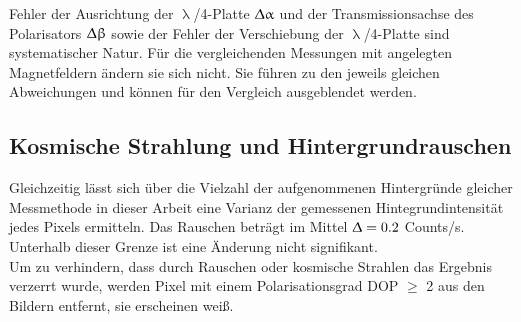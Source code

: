 Fehler der Ausrichtung der $\uplambda$/4-Platte $\Updelta \upalpha$ und der
Transmissionsachse des Polarisators $\Updelta \upbeta$ sowie der Fehler der
Verschiebung der $\uplambda$/4-Platte sind systematischer Natur. Für die
vergleichenden Messungen mit angelegten Magnetfeldern ändern sie sich nicht. Sie
führen zu den jeweils gleichen Abweichungen und können für den Vergleich
ausgeblendet werden. \subsection{Kosmische Strahlung und Hintergrundrauschen}
\label{Rauschen} Gleichzeitig lässt sich über die Vielzahl der aufgenommenen
Hintergründe gleicher Messmethode in dieser Arbeit eine Varianz der
gemessenen Hintegrundintensität jedes Pixels ermitteln. Das Rauschen beträgt im
Mittel $\Updelta= \text{0.2}$ Counts/s. Unterhalb dieser Grenze ist eine
Änderung nicht signifikant.\\ Um zu verhindern, dass durch Rauschen oder
kosmische Strahlen das Ergebnis verzerrt wurde, werden Pixel mit einem
Polarisationsgrad DOP $\geq$ 2 aus den Bildern entfernt, sie erscheinen weiß.
